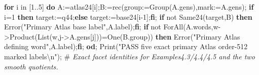 \documentclass[
  10pt,
  letterpaper,
]{article}
\newenvironment{Shaded}{}{}
\newcommand{\BuiltInTok}[1]{\textcolor[rgb]{0.00,0.50,0.00}{#1}}
\newcommand{\CommentTok}[1]{\textcolor[rgb]{0.38,0.63,0.69}{\textit{#1}}}
\newcommand{\ConstantTok}[1]{\textcolor[rgb]{0.53,0.00,0.00}{#1}}
\newcommand{\ControlFlowTok}[1]{\textcolor[rgb]{0.00,0.44,0.13}{\textbf{#1}}}
\newcommand{\ExtensionTok}[1]{#1}
\newcommand{\FloatTok}[1]{\textcolor[rgb]{0.25,0.63,0.44}{#1}}
\newcommand{\NormalTok}[1]{#1}
\newcommand{\OperatorTok}[1]{\textcolor[rgb]{0.40,0.40,0.40}{#1}}
\newcommand{\StringTok}[1]{\textcolor[rgb]{0.25,0.44,0.63}{#1}}
\newcommand{\VariableTok}[1]{\textcolor[rgb]{0.10,0.09,0.49}{#1}}
\begin{document}
\begin{Shaded}
\begin{Highlighting}[]
\ControlFlowTok{for} \VariableTok{i} \ExtensionTok{in}\NormalTok{ [}\FloatTok{1}\OperatorTok{..}\FloatTok{5}\NormalTok{] }\ControlFlowTok{do}
 \VariableTok{A}\OperatorTok{:=}\VariableTok{atlas24}\NormalTok{[}\VariableTok{i}\NormalTok{]}\OperatorTok{;}\VariableTok{B}\OperatorTok{:=}\ExtensionTok{rec}\NormalTok{(}\VariableTok{group}\OperatorTok{:=}\BuiltInTok{Group}\NormalTok{(}\VariableTok{A}\NormalTok{.}\VariableTok{gens}\NormalTok{)}\OperatorTok{,}\VariableTok{mark}\OperatorTok{:=}\VariableTok{A}\NormalTok{.}\VariableTok{gens}\NormalTok{)}\OperatorTok{;}
 \ControlFlowTok{if} \VariableTok{i}\OperatorTok{=}\FloatTok{1} \ControlFlowTok{then} \VariableTok{target}\OperatorTok{:=}\VariableTok{q44}\OperatorTok{;}\ControlFlowTok{else} \VariableTok{target}\OperatorTok{:=}\VariableTok{base24}\NormalTok{[}\VariableTok{i}\OperatorTok{{-}}\FloatTok{1}\NormalTok{]}\OperatorTok{;}\ControlFlowTok{fi}\OperatorTok{;}
 \ControlFlowTok{if} \ConstantTok{not} \VariableTok{Same24}\NormalTok{(}\VariableTok{target}\OperatorTok{,}\VariableTok{B}\NormalTok{) }\ControlFlowTok{then} \BuiltInTok{Error}\NormalTok{(}\StringTok{"Primary Atlas base label"}\OperatorTok{,}\VariableTok{A}\NormalTok{.}\VariableTok{label}\NormalTok{)}\OperatorTok{;}\ControlFlowTok{fi}\OperatorTok{;}
 \ControlFlowTok{if} \ConstantTok{not} \BuiltInTok{ForAll}\NormalTok{(}\VariableTok{A}\NormalTok{.}\VariableTok{words}\OperatorTok{,}\VariableTok{w}\OperatorTok{{-}\textgreater{}}\BuiltInTok{Product}\NormalTok{(}\BuiltInTok{List}\NormalTok{(}\VariableTok{w}\OperatorTok{,}\VariableTok{j}\OperatorTok{{-}\textgreater{}}\VariableTok{A}\NormalTok{.}\VariableTok{gens}\NormalTok{[}\VariableTok{j}\NormalTok{]))}\OperatorTok{=}\BuiltInTok{One}\NormalTok{(}\VariableTok{B}\NormalTok{.}\VariableTok{group}\NormalTok{)) }\ControlFlowTok{then} \BuiltInTok{Error}\NormalTok{(}\StringTok{"Primary Atlas defining word"}\OperatorTok{,}\VariableTok{A}\NormalTok{.}\VariableTok{label}\NormalTok{)}\OperatorTok{;}\ControlFlowTok{fi}\OperatorTok{;}
\ControlFlowTok{od}\OperatorTok{;}
\BuiltInTok{Print}\NormalTok{(}\StringTok{"PASS five exact primary Atlas order{-}512 marked labels\textbackslash{}n"}\NormalTok{)}\OperatorTok{;}
\NormalTok{\#}\CommentTok{ Exact facet identities for Examples4.3/4.4/4.5 and the two smooth quotients.}


\end{Highlighting}
\end{Shaded}
\end{document}
